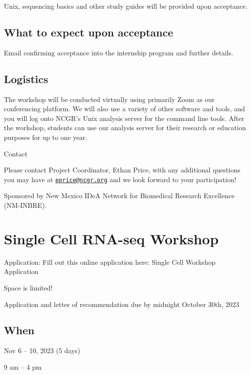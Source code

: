 \documentclass[
]{book}
\begin{document}
Unix, sequencing basics and other study guides will be provided upon acceptance.

\hypertarget{what-to-expect-upon-acceptance}{%
\section{What to expect upon acceptance}\label{what-to-expect-upon-acceptance}}

Email confirming acceptance into the internship program and further details.

\hypertarget{logistics}{%
\section{Logistics}\label{logistics}}

The workshop will be conducted virtually using primarily Zoom as our conferencing platform. We will also use a variety of other software and tools, and you will log onto NCGR's Unix analysis server for the command line tools. After the workshop, students can use our analysis server for their research or education purposes for up to one year.

Contact

Please contact Project Coordinator, Ethan Price, with any additional questions you may have at \href{mailto:eprice@ncgr.org}{\nolinkurl{eprice@ncgr.org}} and we look forward to your participation!

Sponsored by New Mexico IDeA Network for Biomedical Research Excellence (NM-INBRE).

\hypertarget{single-cell-rna-seq-workshop}{%
\chapter{Single Cell RNA-seq Workshop}\label{single-cell-rna-seq-workshop}}

Application: Fill out this online application here: Single Cell Workshop Application

Space is limited!

Application and letter of recommendation due by midnight October 30th, 2023

\hypertarget{when-1}{%
\section{When}\label{when-1}}

Nov 6 -- 10, 2023 (5 days)

9 am -- 4 pm
\end{document}
